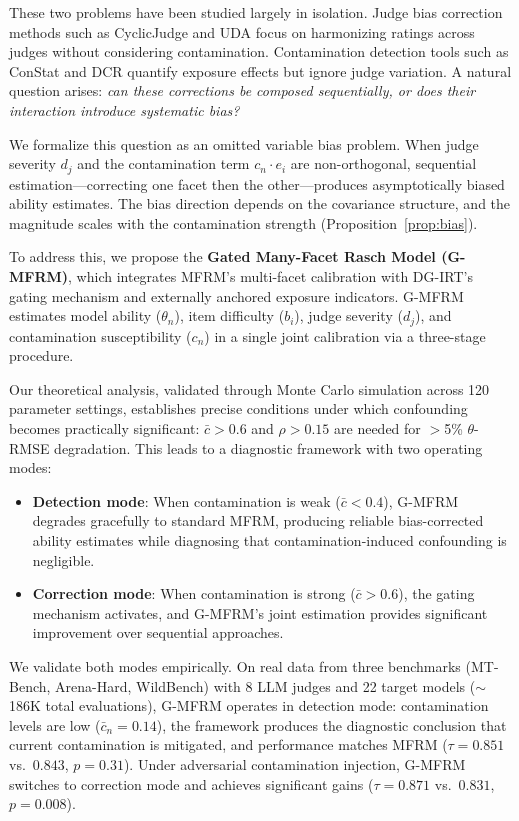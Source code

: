 \documentclass[11pt]{article}
\begin{document}
These two problems have been studied largely in isolation. Judge bias correction methods such as CyclicJudge \cite{bai2024cyclicjudge} and UDA \cite{kwon2024uda} focus on harmonizing ratings across judges without considering contamination. Contamination detection tools such as ConStat \cite{dekoninck2024constat} and DCR \cite{xu2024dcr} quantify exposure effects but ignore judge variation. A natural question arises: \emph{can these corrections be composed sequentially, or does their interaction introduce systematic bias?}

We formalize this question as an omitted variable bias problem. When judge severity $d_j$ and the contamination term $c_n \cdot e_i$ are non-orthogonal, sequential estimation---correcting one facet then the other---produces asymptotically biased ability estimates. The bias direction depends on the covariance structure, and the magnitude scales with the contamination strength (Proposition~\ref{prop:bias}).

To address this, we propose the \textbf{Gated Many-Facet Rasch Model (G-MFRM)}, which integrates MFRM's multi-facet calibration with DG-IRT's gating mechanism \cite{sato2024dg-irt} and externally anchored exposure indicators. G-MFRM estimates model ability ($\theta_n$), item difficulty ($b_i$), judge severity ($d_j$), and contamination susceptibility ($c_n$) in a single joint calibration via a three-stage procedure.

Our theoretical analysis, validated through Monte Carlo simulation across 120 parameter settings, establishes precise conditions under which confounding becomes practically significant: $\bar{c} > 0.6$ and $\rho > 0.15$ are needed for $>$5\% $\theta$-RMSE degradation. This leads to a diagnostic framework with two operating modes:

\begin{itemize}
    \item \textbf{Detection mode}: When contamination is weak ($\bar{c} < 0.4$), G-MFRM degrades gracefully to standard MFRM, producing reliable bias-corrected ability estimates while diagnosing that contamination-induced confounding is negligible.
    \item \textbf{Correction mode}: When contamination is strong ($\bar{c} > 0.6$), the gating mechanism activates, and G-MFRM's joint estimation provides significant improvement over sequential approaches.
\end{itemize}

We validate both modes empirically. On real data from three benchmarks (MT-Bench, Arena-Hard, WildBench) with 8 LLM judges and 22 target models (${\sim}$186K total evaluations), G-MFRM operates in detection mode: contamination levels are low ($\bar{c}_n = 0.14$), the framework produces the diagnostic conclusion that current contamination is mitigated, and performance matches MFRM ($\tau = 0.851$ vs.\ $0.843$, $p = 0.31$). Under adversarial contamination injection, G-MFRM switches to correction mode and achieves significant gains ($\tau = 0.871$ vs.\ $0.831$, $p = 0.008$).
\end{document}
